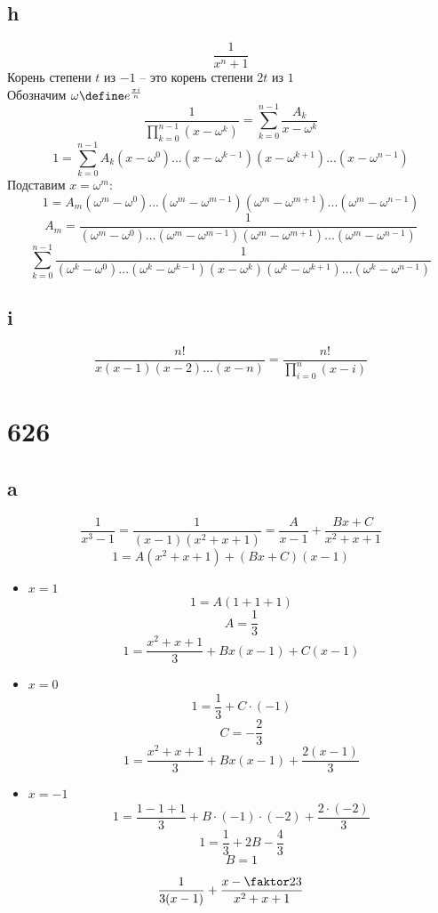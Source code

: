 \subsection{h}

$$ \frac1{x^n + 1} $$
Корень степени $ t $ из $ -1 $ -- это корень степени $ 2t $ из $ 1 $ \\
Обозначим $ \omega \define e^{\frac{\pi i}n} $
$$ \frac1{\prod_{k = 0}^{n - 1}(x - \omega^k)} = \sum_{k = 0}^{n - 1} \frac{A_k}{x - \omega^k} $$
$$ 1 = \sum_{k = 0}^{n - 1} A_k(x - \omega^0)...(x - \omega^{k - 1})(x - \omega^{k + 1})...(x - \omega^{n - 1}) $$
Подставим $ x = \omega^m $:
$$ 1 = A_m(\omega^m - \omega^0)...(\omega^m - \omega^{m - 1})(\omega^m - \omega^{m + 1})...(\omega^m - \omega^{n - 1}) $$
$$ A_m = \frac1{(\omega^m - \omega^0)...(\omega^m - \omega^{m - 1})(\omega^m - \omega^{m + 1})...(\omega^m - \omega^{n - 1})} $$
$$ \sum_{k = 0}^{n - 1} \frac1{(\omega^k - \omega^0)...(\omega^k - \omega^{k - 1})(x - \omega^k)(\omega^k - \omega^{k + 1})...(\omega^k - \omega^{n - 1})} $$

\subsection{i}

$$ \frac{n!}{x(x - 1)(x - 2)...(x - n)} = \frac{n!}{\prod_{i = 0}^n (x - i)} $$

\section{626}

\subsection{a}

$$ \frac1{x^3 - 1} = \frac1{(x - 1)(x^2 + x + 1)} = \frac{A}{x - 1} + \frac{Bx + C}{x^2 + x + 1} $$
$$ 1 = A(x^2 + x + 1) + (Bx + C)(x - 1) $$
\begin{itemize}
	\item $ x = 1 $
    $$ 1 = A(1 + 1 + 1) $$
    $$ A = \frac13 $$
    $$ 1 = \frac{x^2 + x + 1}3 + Bx(x - 1) + C(x - 1) $$
    \item $ x = 0 $
    $$ 1 = \frac13 + C \cdot (-1) $$
    $$ C = -\frac23 $$
    $$ 1 = \frac{x^2 + x + 1}3 + Bx(x - 1) + \frac{2(x - 1)}3 $$
    \item $ x = -1 $
    $$ 1 = \frac{1 - 1 + 1}3 + B \cdot (-1) \cdot (-2) + \frac{2 \cdot (-2)}3 $$
    $$ 1 = \frac13 + 2B - \frac43 $$
    $$ B = 1 $$
\end{itemize}
$$ \frac1{3(x - 1)} + \frac{x - \faktor23}{x^2 + x + 1} $$

